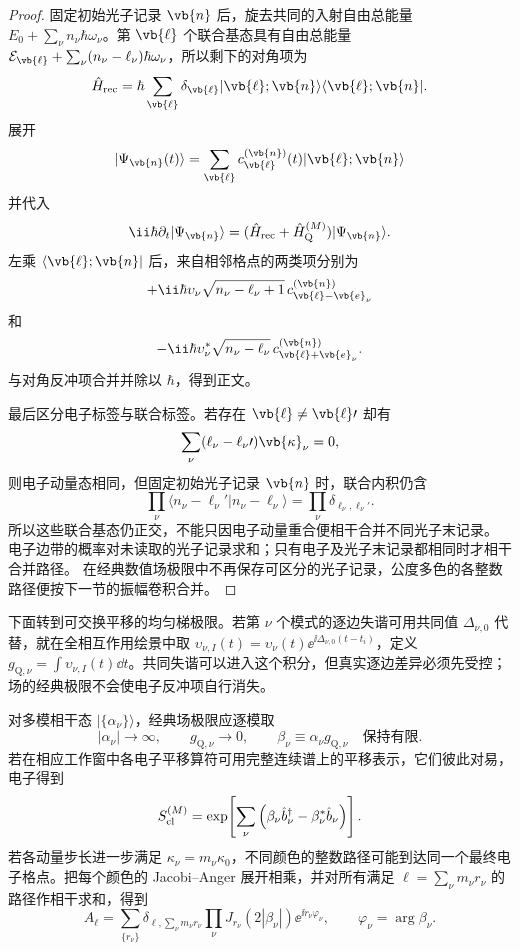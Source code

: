 \begin{proof}
固定初始光子记录 $\vb{n}$ 后，旋去共同的入射自由总能量 $E_0+\sum_\nu n_\nu\hbar\omega_\nu$。第 $\vb{\ell}$ 个联合基态具有自由总能量 $\mathcal E_{\vb{\ell}}+\sum_\nu(n_\nu-\ell_\nu)\hbar\omega_\nu$，所以剩下的对角项为
\[
\hat H_{\rm rec}
=
\hbar\sum_{\vb{\ell}}
\delta_{\vb{\ell}}
|\vb{\ell};\vb{n}\rangle\langle\vb{\ell};\vb{n}|.
\]
展开
\[
|\Psi_{\vb{n}}(t)\rangle
=
\sum_{\vb{\ell}}
c_{\vb{\ell}}^{(\vb{n})}(t)
|\vb{\ell};\vb{n}\rangle
\]
并代入
\[
\ii\hbar\partial_t|\Psi_{\vb{n}}\rangle
=
(\hat H_{\rm rec}+\hat H_{\rm Q}^{(M)})
|\Psi_{\vb{n}}\rangle.
\]
左乘 $\langle\vb{\ell};\vb{n}|$ 后，来自相邻格点的两类项分别为
\[
+\ii\hbar
\upsilon_\nu
\sqrt{n_\nu-\ell_\nu+1}\,
c_{\vb{\ell}-\vb{e}_\nu}^{(\vb{n})}
\]
和
\[
-\ii\hbar
\upsilon_\nu^*
\sqrt{n_\nu-\ell_\nu}\,
c_{\vb{\ell}+\vb{e}_\nu}^{(\vb{n})}.
\]
与对角反冲项合并并除以 $\hbar$，得到正文。

最后区分电子标签与联合标签。若存在
$\vb{\ell}\neq\vb{\ell}\prime$ 却有
\[
\sum_\nu(\ell_\nu-\ell_\nu\prime)\vb{\kappa}_\nu=0,
\]
则电子动量态相同，但固定初始光子记录 $\vb{n}$ 时，联合内积仍含
\[
\prod_\nu\langle n_\nu-\ell_\nu\prime|n_\nu-\ell_\nu\rangle
=\prod_\nu\delta_{\ell_\nu,\ell_\nu\prime}.
\]
所以这些联合基态仍正交，不能只因电子动量重合便相干合并不同光子末记录。
电子边带的概率对未读取的光子记录求和；只有电子及光子末记录都相同时才相干合并路径。
在经典数值场极限中不再保存可区分的光子记录，公度多色的各整数路径便按下一节的振幅卷积合并。
\end{proof}


下面转到可交换平移的均匀梯极限。若第 $\nu$ 个模式的逐边失谐可用共同值 $\Delta_{\nu,0}$ 代替，就在全相互作用绘景中取 $\upsilon_{\nu,I}(t)=\upsilon_\nu(t)\ee^{\ii\Delta_{\nu,0}(t-t_i)}$，定义 $g_{\mathrm Q,\nu}=\int\upsilon_{\nu,I}(t)\dd t$。共同失谐可以进入这个积分，但真实逐边差异必须先受控；场的经典极限不会使电子反冲项自行消失。

对多模相干态
$|\{\alpha_\nu\}\rangle$，经典场极限应逐模取
\[
|\alpha_\nu|\to\infty,
\qquad
g_{\mathrm Q,\nu}\to0,
\qquad
\beta_\nu
\equiv
\alpha_\nu g_{\mathrm Q,\nu}
\quad\text{保持有限}.
\]
若在相应工作窗中各电子平移算符可用完整连续谱上的平移表示，它们彼此对易，电子得到
\begin{equation}
{
 S_{\rm cl}^{(M)}
 =
 \exp\!\left[
 \sum_\nu
 \left(
 \beta_\nu\hat b_\nu^\dagger
 -\beta_\nu^*\hat b_\nu
 \right)
 \right].}
\label{eq:multicolor_classical_scattering_dp47}
\end{equation}
若各动量步长进一步满足
$\kappa_\nu=m_\nu\kappa_0$，不同颜色的整数路径可能到达同一个最终电子格点。把每个颜色的 Jacobi--Anger 展开相乘，并对所有满足
$\ell=\sum_\nu m_\nu r_\nu$
的路径作相干求和，得到
\begin{equation}
{
 A_\ell
 =\sum_{\{r_\nu\}}
 \delta_{\ell,\sum_\nu m_\nu r_\nu}
 \prod_\nu
 J_{r_\nu}(2|\beta_\nu|)
 \ee^{\ii r_\nu\varphi_\nu},
 \qquad
 \varphi_\nu=\arg\beta_\nu .}
\label{eq:multicolor_pinem_convolution_dp47}
\end{equation}

